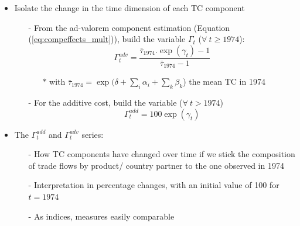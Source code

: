 \documentclass[10 pt,Helvetica, french]{beamer}
\begin{document}
\begin{frame}
\begin{itemize}
\item Isolate the change in the time dimension of each TC component \vspace{0.1cm}
\begin{itemize}
\item[-] From the ad-valorem component estimation (Equation (\ref{eq:compeffects_mult})), build the variable $\Gamma_t$ ($\forall~t \geq 1974$):
\footnotesize
\begin{equation*}
 \Gamma^{adv}_t= \frac {\bar{\tau}_{1974}.\exp(\gamma_t)-1} {\bar{\tau}_{1974}-1}
\end{equation*}
\normalsize
\begin{itemize}
\item[$\ast$] with $\bar{\tau}_{1974} = \exp(\delta+\sum_i \alpha_i + \sum_k \beta_k$) the mean TC in 1974
\end{itemize}
\item[-] For the additive cost, build the variable ($\forall~t > 1974$)
\footnotesize
$$\Gamma^{add}_t = 100 \exp(\gamma_t)$$
\normalsize
\end{itemize}
\item The $\Gamma^{add}_t$ and $\Gamma^{adv}_t$ series:
\begin{itemize}
\item[-] How TC components have changed over time if we stick the composition of trade flows by product/ country partner to the one observed in 1974  \vspace{0.1cm}
\item[-] Interpretation in percentage changes, with an initial value of 100 for $t=1974$    \vspace{0.1cm}
\item[-] As indices, measures easily comparable
\end{itemize}
\end{itemize}

\end{frame}
\end{document}
